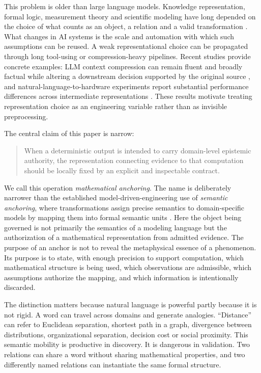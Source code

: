 \documentclass[11pt,a4paper]{article}
\begin{document}
This problem is older than large language models. Knowledge representation, formal logic, measurement theory and scientific modeling have long depended on the choice of what counts as an object, a relation and a valid transformation \cite{scottSuppes1958,davis1993,suarez2004}. What changes in AI systems is the scale and automation with which such assumptions can be reused. A weak representational choice can be propagated through long tool-using or compression-heavy pipelines. Recent studies provide concrete examples: LLM context compression can remain fluent and broadly factual while altering a downstream decision supported by the original source \cite{lee2026}, and natural-language-to-hardware experiments report substantial performance differences across intermediate representations \cite{fu2026}. These results motivate treating representation choice as an engineering variable rather than as invisible preprocessing.

The central claim of this paper is narrow:

\begin{quote}
When a deterministic output is intended to carry domain-level epistemic authority, the representation connecting evidence to that computation should be locally fixed by an explicit and inspectable contract.
\end{quote}

We call this operation \emph{mathematical anchoring}. The name is deliberately narrower than the established model-driven-engineering use of \emph{semantic anchoring}, where transformations assign precise semantics to domain-specific models by mapping them into formal semantic units \cite{chen2005infra,chen2005transform}. Here the object being governed is not primarily the semantics of a modeling language but the authorization of a mathematical representation from admitted evidence. The purpose of an anchor is not to reveal the metaphysical essence of a phenomenon. Its purpose is to state, with enough precision to support computation, which mathematical structure is being used, which observations are admissible, which assumptions authorize the mapping, and which information is intentionally discarded.

The distinction matters because natural language is powerful partly because it is not rigid. A word can travel across domains and generate analogies. ``Distance'' can refer to Euclidean separation, shortest path in a graph, divergence between distributions, organizational separation, decision cost or social proximity. This semantic mobility is productive in discovery. It is dangerous in validation. Two relations can share a word without sharing mathematical properties, and two differently named relations can instantiate the same formal structure.
\end{document}
